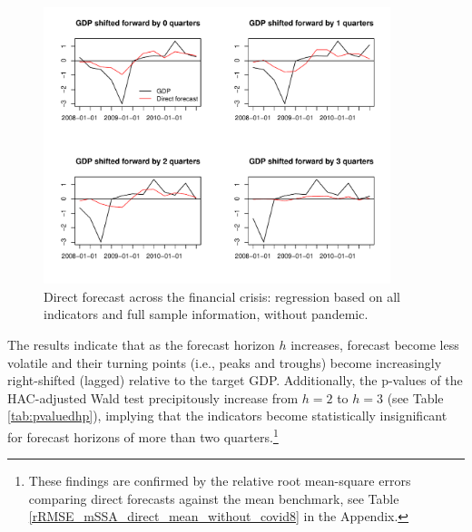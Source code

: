 \documentclass[11pt,a4paper]{article}
\begin{document}
\begin{figure}[H]
    \begin{center}
        \includegraphics[width=0.9\textwidth]{./Figures/direct_wc_financial_crisis.pdf}
        \caption{Direct forecast across the financial crisis:  regression based on all indicators and full sample information, without pandemic.
        \label{direct_wc_financial_crisis}}
    \end{center}
\end{figure}

The results indicate that as the forecast horizon $h$ increases, forecast become less volatile and their turning points (i.e., peaks and troughs) become increasingly right-shifted (lagged) relative to the target GDP. Additionally, the p-values of the HAC-adjusted Wald test precipitously increase from $h=2$ to $h=3$ (see Table \eqref{tab:pvaluedhp}), implying that the indicators become statistically insignificant for forecast horizons of more than two quarters.\footnote{ 
These findings are confirmed by the relative root mean-square errors comparing direct forecasts against the mean benchmark, see Table \eqref{rRMSE_mSSA_direct_mean_without_covid8} in the Appendix.} 

\end{document}
